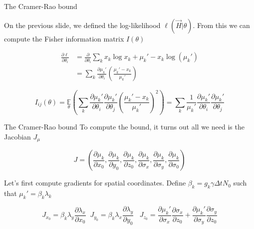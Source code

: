 \documentclass[aspectratio=169]{beamer}
\begin{document}
\begin{frame}{The Cramer-Rao bound}

On the previous slide, we defined the log-likelihood $\ell(\vec{H}|\theta)$. From this we can compute the Fisher information matrix $I(\theta)$

\begin{align*}
\frac{\partial \ell}{\partial \theta_{i}} &= \frac{\partial}{\partial \theta_{i}} \sum_{k}  x_{k}\log x_{k} + \mu_{k}' - x_{k}\log\left(\mu_{k}'\right)\\
&= \sum_{k} \frac{\partial \mu_{k}'}{\partial\theta_{i}} \left(\frac{\mu_{k}'-x_{k}}{\mu_{k}'}\right)
\end{align*}

\begin{equation*}
I_{ij}(\theta) = \underset{\theta}{\mathbb{E}}\left(\sum_{k}\frac{\partial \mu_{k}'}{\partial\theta_{i}}\frac{\partial \mu_{k}'}{\partial\theta_{j}} \left(\frac{\mu_{k}'-x_{k}}{\mu_{k}'}\right)^{2}\right) = \sum_{k}\frac{1}{\mu_{k}'}\frac{\partial \mu_{k}'}{\partial\theta_{i}}\frac{\partial \mu_{k}'}{\partial\theta_{j}}
\end{equation*}

\end{frame}

\begin{frame}{The Cramer-Rao bound}
To compute the bound, it turns out all we need is the Jacobian $J_{\mu}$

\begin{equation*}
J = \left(\frac{\partial \mu_{k}}{\partial x_{0}},\frac{\partial \mu_{k}}{\partial y_{0}},\frac{\partial \mu_{k}}{\partial z_{0}},\frac{\partial \mu_{k}}{\partial \sigma_{x}},\frac{\partial \mu_{k}}{\partial \sigma_{y}},\frac{\partial \mu_{k}}{\partial \sigma_{0}}\right)
\end{equation*}

Let's first compute gradients for spatial coordinates. Define $\beta_{k} = g_{k}\gamma\Delta t N_{0}$ such that $\mu_{k}' = \beta_{k}\lambda_{k}$

\begin{equation*}
J_{x_{0}} = \beta_{k}\lambda_{y}\frac{\partial \lambda_{x}}{\partial x_{0}} \;\; J_{y_{0}} = \beta_{k}\lambda_{x}\frac{\partial \lambda_{y}}{\partial y_{0}}\;\;\; J_{z_{0}}  = \frac{\partial \mu_{k}'}{\partial \sigma_{x}}\frac{\partial \sigma_{x}}{\partial z_{0}} + \frac{\partial \mu_{k}'}{\partial \sigma_{y}}\frac{\partial \sigma_{y}}{\partial z_{0}}
\end{equation*}


\end{frame}
\end{document}

